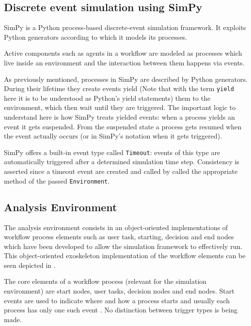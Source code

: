 \documentclass{seal_thesis}
\begin{document}
\subsection{Discrete event simulation using SimPy}

SimPy is a Python process-based discrete-event simulation framework. It exploits Python generators according to which it models its processes.

Active components such as agents in a workflow are modeled as processes which live inside an environment and the interaction between them happens via events.

As previously mentioned, processes in SimPy are described by Python generators. During their lifetime they create events yield (Note that with the term \texttt{yield} here it is to be understood as Python's yield statements) them to the environment, which then wait until they are triggered. The important logic to understand here is how SimPy treats yielded events: when a process yields an event it gets suspended. From the suspended state a process gets resumed when the event actually occurs (or in SimPy's notation when it gets triggered).

SimPy offers a built-in event type called \texttt{Timeout}: events of this type are automatically triggered after a determined simulation time step. Consistency is asserted since a timeout event are created and called by called the appropriate method of the passed \texttt{Environment}.

\subsection{Analysis Environment}

The analysis environment consists in an object-oriented implementations of workflow process elements such as user task, starting, decision and end nodes which have been developed to allow the simulation framework to effectively run. This object-oriented exoskeleton implementation of the workflow elements can be seen depicted in .


The core elements of a workflow process (relevant for the simulation environment) are start nodes, user tasks, decision nodes and end nodes. Start events are used to indicate where and how a process starts and usually each process has only one such event \cite[p. 42]{Silver2011}. No distinction between trigger types is being made.
\end{document}
